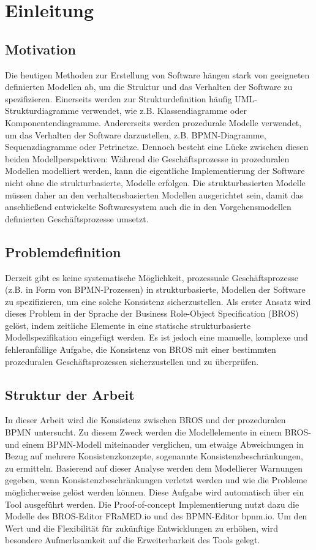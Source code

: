 \chapter{Einleitung}

\section{Motivation}

Die heutigen Methoden zur Erstellung von Software hängen stark von geeigneten definierten Modellen ab, um die Struktur und das Verhalten der Software zu spezifizieren.
Einerseits werden zur Strukturdefinition häufig UML-Strukturdiagramme verwendet, wie z.B. Klassendiagramme oder Komponentendiagramme.
Andererseits werden prozedurale Modelle verwendet, um das Verhalten der Software darzustellen, z.B. BPMN-Diagramme, Sequenzdiagramme oder Petrinetze.
Dennoch besteht eine Lücke zwischen diesen beiden Modellperspektiven: Während die Geschäftsprozesse in prozeduralen Modellen modelliert werden, kann die eigentliche Implementierung der Software nicht ohne die strukturbasierte, Modelle erfolgen.
Die strukturbasierten Modelle müssen daher an den verhaltensbasierten Modellen ausgerichtet sein, damit das anschließend entwickelte Softwaresystem auch die in den Vorgehensmodellen definierten Geschäftsprozesse umsetzt.

\section{Problemdefinition}

Derzeit gibt es keine systematische Möglichkeit, prozessuale Geschäftsprozesse (z.B. in Form von BPMN-Prozessen) in strukturbasierte, Modellen der Software zu spezifizieren, um eine solche Konsistenz sicherzustellen.
Als erster Ansatz wird dieses Problem in der Sprache der Business Role-Object Specification (BROS) gelöst, indem zeitliche Elemente in eine statische strukturbasierte Modellspezifikation eingefügt werden.
Es ist jedoch eine manuelle, komplexe und fehleranfällige Aufgabe, die Konsistenz von BROS mit einer bestimmten prozeduralen Geschäftsprozessen sicherzustellen und zu überprüfen.

\section{Struktur der Arbeit}

In dieser Arbeit wird die Konsistenz zwischen BROS und der prozeduralen BPMN untersucht.
Zu diesem Zweck werden die Modellelemente in einem BROS- und einem BPMN-Modell miteinander verglichen, um etwaige Abweichungen in Bezug auf mehrere Konsistenzkonzepte, sogenannte Konsistenzbeschränkungen, zu ermitteln.
Basierend auf dieser Analyse werden dem Modellierer Warnungen gegeben, wenn Konsistenzbeschränkungen verletzt werden und wie die Probleme möglicherweise gelöst werden können.
Diese Aufgabe wird automatisch über ein Tool ausgeführt werden. 
Die Proof-of-concept Implementierung nutzt dazu die Modelle des BROS-Editor FRaMED.io und des BPMN-Editor bpnm.io.
Um den Wert und die Flexibilität für zukünftige Entwicklungen zu erhöhen, wird besondere Aufmerksamkeit auf die Erweiterbarkeit des Tools gelegt.
